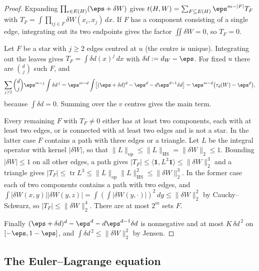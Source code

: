 \begin{proof}
Expanding $\prod_{e\in E(H)}(\eps+\delta W)$ gives
$t(H,W)=\sum_{F\subseteq E(H)}\eps^{m-|F|}T_F$ with
$T_F=\int\prod_{ij\in F}\delta W(x_i,x_j)\,dx$.  If $F$ has a component
consisting of a single edge, integrating out its two endpoints gives the
factor $\iint\delta W=0$, so $T_F=0$.

Let $F$ be a star with $j\ge2$ edges centred at $u$ (the centre is unique).
Integrating out the leaves gives $T_F=\int\delta d(x)^j\,dx$ with
$\delta d:=d_W-\eps$.  For fixed $u$ there are $\binom dj$ such $F$, and
\[
  \sum_{j\ge2}\binom dj\eps^{m-j}\int\delta d^{\,j}
  =\eps^{m-d}\int\bigl[(\eps+\delta d)^d-\eps^d-d\eps^{d-1}\delta d\bigr]
  =\eps^{m-d}\bigl(\tau_d(W)-\eps^d\bigr),
\]
because $\int\delta d=0$.  Summing over the $v$ centres gives the main term.

Every remaining $F$ with $T_F\ne0$ either has at least two components, each
with at least two edges, or is connected with at least two edges and is not a
star.  In the latter case $F$ contains a path with three edges or a
triangle.  Let $L$ be the integral operator with kernel $|\delta W|$, so that
$\|L\|_{\mathrm{op}}\le\|L\|_{\mathrm{HS}}=\|\delta W\|_2\le1$.  Bounding
$|\delta W|\le1$ on all other edges, a path gives
$|T_F|\le\langle\mathbf 1,L^3\mathbf 1\rangle\le\|\delta W\|_2^3$ and a triangle
gives $|T_F|\le\operatorname{tr}L^3\le\|L\|_{\mathrm{op}}\|L\|_{\mathrm{HS}}^2
\le\|\delta W\|_2^3$.  In the former case each of two components contains a
path with two edges, and
$\int|\delta W(x,y)||\delta W(y,z)|=\int(\int|\delta W(y,\cdot)|)^2\,dy
\le\|\delta W\|_2^2$ by Cauchy--Schwarz, so $|T_F|\le\|\delta W\|_2^4$.
There are at most $2^m$ sets $F$.

Finally $(\eps+\delta d)^d-\eps^d-d\eps^{d-1}\delta d$ is nonnegative and at
most $K\,\delta d^{\,2}$ on $[-\eps,1-\eps]$, and
$\int\delta d^{\,2}\le\|\delta W\|_2^2$ by Jensen.
\end{proof}

\subsection{The Euler--Lagrange equation}
\label{kb:sec:el}

